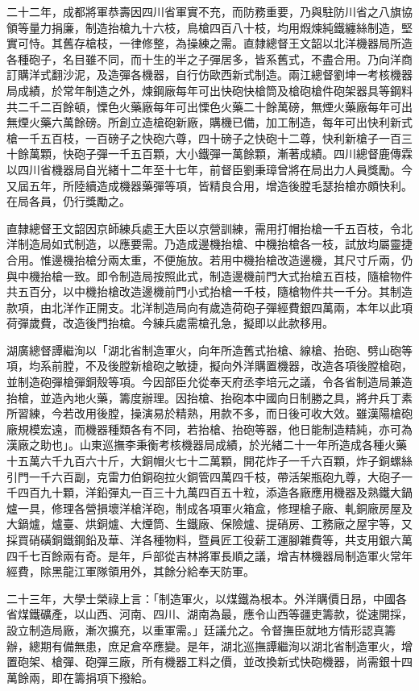 \begin{pinyinscope}
二十二年，成都將軍恭壽因四川省軍實不充，而防務重要，乃與駐防川省之八旗協領等量力捐廉，制造抬槍九十六枝，鳥槍四百八十枝，均用煆煉純鐵纏絲制造，堅實可恃。其舊存槍枝，一律修整，為操練之需。直隸總督王文韶以北洋機器局所造各種砲子，名目雖不同，而十生的半之子彈居多，皆系舊式，不盡合用。乃向洋商訂購洋式翻沙泥，及造彈各機器，自行仿歐西新式制造。兩江總督劉坤一考核機器局成績，於常年制造之外，煉鋼廠每年可出快砲快槍筒及槍砲槍件砲架器具等鋼料共二千二百餘頓，慄色火藥廠每年可出慄色火藥二十餘萬磅，無煙火藥廠每年可出無煙火藥六萬餘磅。所創立造槍砲新廠，購機已備，加工制造，每年可出快利新式槍一千五百枝，一百磅子之快砲六尊，四十磅子之快砲十二尊，快利新槍子一百三十餘萬顆，快砲子彈一千五百顆，大小鐵彈一萬餘顆，漸著成績。四川總督鹿傳霖以四川省機器局自光緒十二年至十七年，前督臣劉秉璋曾將在局出力人員獎勵。今又屆五年，所陸續造成機器藥彈等項，皆精良合用，增造後膛毛瑟抬槍亦頗快利。在局各員，仍行獎勵之。

直隸總督王文韶因京師練兵處王大臣以京營訓練，需用打帽抬槍一千五百枝，令北洋制造局如式制造，以應要需。乃造成邊機抬槍、中機抬槍各一枝，試放均屬靈捷合用。惟邊機抬槍分兩太重，不便施放。若用中機抬槍改造邊機，其尺寸斤兩，仍與中機抬槍一致。即令制造局按照此式，制造邊機前門大式抬槍五百枝，隨槍物件共五百分，以中機抬槍改造邊機前門小式抬槍一千枝，隨槍物件共一千分。其制造款項，由北洋作正開支。北洋制造局向有歲造荷砲子彈經費銀四萬兩，本年以此項荷彈歲費，改造後門抬槍。今練兵處需槍孔急，擬即以此款移用。

湖廣總督譚繼洵以「湖北省制造軍火，向年所造舊式抬槍、線槍、抬砲、劈山砲等項，均系前膛，不及後膛新槍砲之敏捷，擬向外洋購置機器，改造各項後膛槍砲，並制造砲彈槍彈銅殼等項。今因部臣允從奉天府丞李培元之議，令各省制造局兼造抬槍，並造內地火藥，籌度辦理。因抬槍、抬砲本中國向日制勝之具，將弁兵丁素所習練，今若改用後膛，操演易於精熟，用款不多，而日後可收大效。雖漢陽槍砲廠規模宏遠，而機器種類各有不同，若抬槍、抬砲等器，他日能制造精純，亦可為漢廠之助也」。山東巡撫李秉衡考核機器局成績，於光緒二十一年所造成各種火藥十五萬六千九百六十斤，大銅帽火七十二萬顆，開花炸子一千六百顆，炸子銅螺絲引門一千六百副，克雷力伯銅砲拉火銅管四萬四千枝，帶活架瓶砲九尊，大砲子一千四百九十顆，洋鉛彈丸一百三十九萬四百五十粒，添造各廠應用機器及熟鐵大鍋爐一具，修理各營損壞洋槍洋砲，制成各項軍火箱盒，修理槍子廠、軋銅廠房屋及大鍋爐，爐臺、烘銅爐、大煙筒、生鐵廠、保險爐、提硝房、工務廠之屋宇等，又採買硝磺銅鐵鋼鉛及華、洋各種物料，暨員匠工役薪工運腳雜費等，共支用銀六萬四千七百餘兩有奇。是年，戶部從吉林將軍長順之議，增吉林機器局制造軍火常年經費，除黑龍江軍隊領用外，其餘分給奉天防軍。

二十三年，大學士榮祿上言：「制造軍火，以煤鐵為根本。外洋購價日昂，中國各省煤鐵礦產，以山西、河南、四川、湖南為最，應令山西等疆吏籌款，從速開採，設立制造局廠，漸次擴充，以重軍需。」廷議允之。令督撫臣就地方情形認真籌辦，總期有備無患，庶足倉卒應變。是年，湖北巡撫譚繼洵以湖北省制造軍火，增置砲架、槍彈、砲彈三廠，所有機器工料之價，並改換新式快砲機器，尚需銀十四萬餘兩，即在籌捐項下撥給。


\end{pinyinscope}
